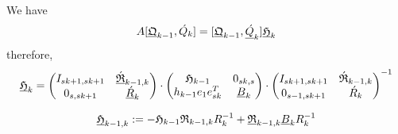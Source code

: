 \documentclass{scrartcl}
\numberwithin{equation}{section}
\begin{document}
We have
\begin{eqnarray*}
	A [\underline{\frak{Q}}_{k - 1}, \acute{Q}_k] = [ \underline{\frak{Q}}_{k - 1}, \underline{\acute{Q}}_k ] \underline{\frak{H}}_k
\end{eqnarray*}
therefore,
\begin{eqnarray*}
	\underline{\frak{H}}_k = 
	\begin{pmatrix}
		I_{sk + 1, sk + 1} & \underline{\acute{\frak{R}}}_{k - 1, k} \\
		0_{s, sk + 1} & \underline{\acute{R}}_k \\
	\end{pmatrix} \cdot
	\begin{pmatrix}
		\frak{H}_{k - 1} & 0_{sk, s} \\
		h_{k - 1} e_1 e^T_{sk} & \underline{B}_k \\
	\end{pmatrix} \cdot
	\begin{pmatrix}
		I_{sk + 1, sk + 1} & \acute{\frak{R}}_{k - 1, k} \\
		0_{s - 1, sk + 1} &\acute{R}_k \\
	\end{pmatrix}^{-1}
\end{eqnarray*}

\begin{equation}\label{eq:h_blackletter_k_}
\underline{\frak{H}}_{k - 1, k} := -\frak{H}_{k - 1} \frak{R}_{k - 1, k} R^{-1}_k + \underline{\frak{R}}_{k - 1, k} \underline{B}_k R^{-1}_k
\end{equation}
\end{document}
